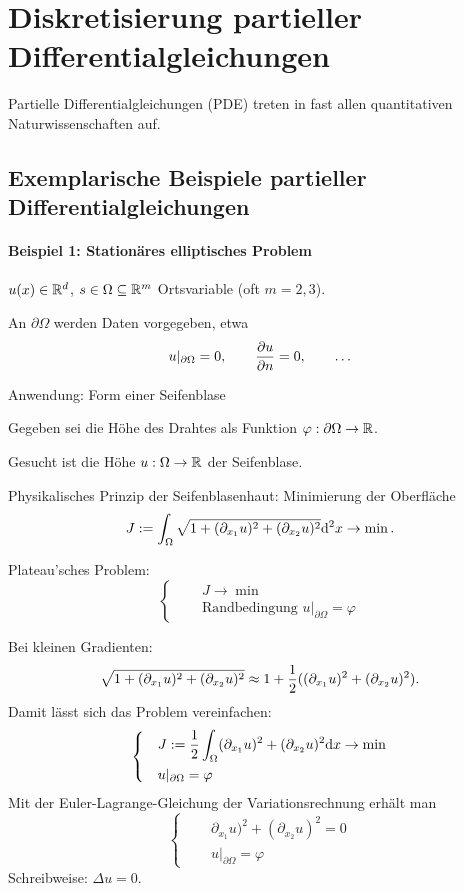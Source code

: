 \chapter{Diskretisierung partieller Differentialgleichungen}
Partielle Differentialgleichungen (PDE) treten in fast allen quantitativen
Naturwissenschaften auf.

\section{Exemplarische Beispiele partieller Differentialgleichungen}
\subsubsection*{Beispiel 1: Stationäres elliptisches Problem}
$u(x) \in \mathbb{R}^d$, $s \in \Omega \subseteq \mathbb{R}^m$ Ortsvariable (oft $m = 2,
3$).

An $\partial \Omega$ werden Daten vorgegeben, etwa
\[ u |_{\partial \Omega} = 0, \qquad \frac{\partial u}{\partial n} = 0, \qquad \ldots \]

Anwendung: Form einer Seifenblase

Gegeben sei die Höhe des Drahtes als Funktion $\varphi: \partial \Omega \to
\mathbb{R}$.

Gesucht ist die Höhe $u: \Omega \to \mathbb{R}$ der Seifenblase.

Physikalisches Prinzip der Seifenblasenhaut: Minimierung der Oberfläche
\[ J := \int_\Omega \sqrt{1 + (\partial_{x_1} u)^2 + (\partial_{x_2} u)^2}
  \mathrm{d}^2 x \to \min. \]


Plateau'sches Problem:
\[ \left\{ \quad \begin{aligned}
      &J \to \min \\
      &\text{Randbedingung } u|_{\partial \Omega} = \varphi
    \end{aligned}
  \right.
\]

Bei kleinen Gradienten:
\[ \sqrt{ 1 + (\partial_{x_1} u)^2 + (\partial_{x_2} u)^2}
  \approx
  1 + \frac{1}{2} ((\partial_{x_1} u)^2 + (\partial_{x_2} u)^2). \]
Damit lässt sich das Problem vereinfachen:
\[ \left\{ \quad \begin{aligned}
      &J := \frac{1}{2} \int_\Omega (\partial_{x_1} u)^2 + (\partial_{x_2} u)^2
      \mathrm{d} x \to \min \\
      &u|_{\partial \Omega} = \varphi
    \end{aligned}
  \right.
\]
Mit der Euler-Lagrange-Gleichung der Variationsrechnung erhält man
\[ \left\{ \quad \begin{aligned}
      &\partial_{x_1} u)^2 + (\partial_{x_2} u)^2 = 0 \\
      &u|_{\partial \Omega} = \varphi
    \end{aligned}
  \right.
\]
Schreibweise: $\Delta u = 0$.

